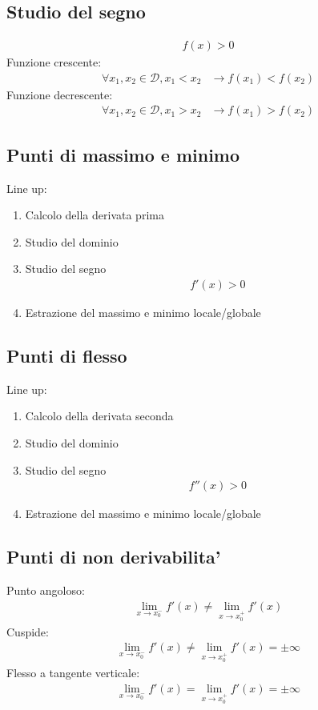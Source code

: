 \documentclass[a4paper]{article}
\begin{document}
		\subsection{Studio del segno}
		\begin{align*}
			f(x) > 0
		\end{align*}
		Funzione crescente:
		\begin{align*}
			\forall x_1,x_2 \in \mathcal{D}, x_1 < x_2 &\to f(x_1)<f(x_2)
		\end{align*}
		Funzione decrescente:
		\begin{align*}
			\forall x_1,x_2 \in \mathcal{D}, x_1 > x_2 &\to f(x_1)>f(x_2)
		\end{align*}

		\subsection{Punti di massimo e minimo}
		Line up:
		\begin{enumerate}
			\item Calcolo della derivata prima
			\item Studio del dominio
			\item Studio del segno
			\begin{align*}
				f'(x) > 0
			\end{align*}
			\item Estrazione del massimo e minimo locale/globale 
		\end{enumerate}
		
		
		\subsection{Punti di flesso}
		Line up:
		\begin{enumerate}
			\item Calcolo della derivata seconda
			\item Studio del dominio
			\item Studio del segno
			\begin{align*}
			f''(x) > 0
			\end{align*}
			\item Estrazione del massimo e minimo locale/globale 
		\end{enumerate}		

	\subsection{Punti di non derivabilita'}
	Punto angoloso:
	\begin{align*}
		\lim\limits_{x \to x_0^-}f'(x) \ne \lim\limits_{x \to x_0^+}f'(x)
	\end{align*}
	Cuspide:
	\begin{align*}
		\lim\limits_{x \to x_0^-}f'(x) \ne \lim\limits_{x \to x_0^+}f'(x) = \pm \infty
	\end{align*}
	Flesso a tangente verticale:
	\begin{align*}
		\lim\limits_{x \to x_0^-}f'(x) = \lim\limits_{x \to x_0^+}f'(x) = \pm \infty
	\end{align*}
	
\end{document}

